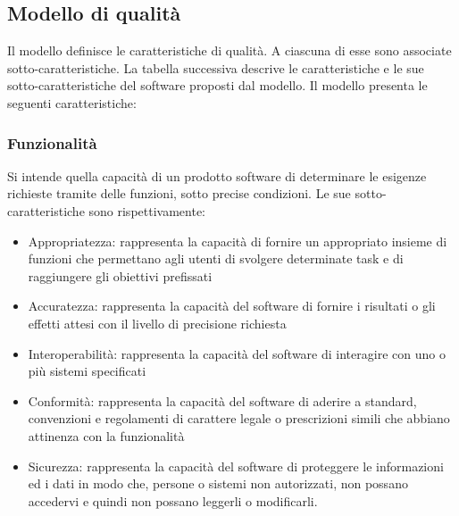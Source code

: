 \subsection{Modello di qualità}
Il modello definisce le caratteristiche di qualità. A ciascuna di esse sono associate sotto-caratteristiche. La tabella successiva descrive le caratteristiche e le sue sotto-caratteristiche del software proposti dal modello. 
Il modello presenta le seguenti caratteristiche:

\subsubsection{Funzionalità}
Si intende quella capacità di un prodotto software di determinare le esigenze richieste tramite delle funzioni, sotto precise condizioni.
Le sue sotto-caratteristiche sono rispettivamente:
\begin{itemize}
\item Appropriatezza: rappresenta la capacità di fornire un appropriato insieme di funzioni che permettano agli utenti di svolgere determinate task e di raggiungere gli obiettivi prefissati
\item Accuratezza: rappresenta la capacità del software di fornire i risultati o gli effetti attesi con il livello di precisione richiesta
\item Interoperabilità: rappresenta la capacità del software di interagire con uno o più sistemi specificati
\item Conformità: rappresenta la capacità del software di aderire a standard, convenzioni e regolamenti di carattere legale o prescrizioni simili che abbiano attinenza con la funzionalità
\item Sicurezza: rappresenta la capacità del software di proteggere le informazioni ed i dati in modo che, persone o sistemi non autorizzati, non possano accedervi e quindi non possano leggerli o modificarli.
\end{itemize}

